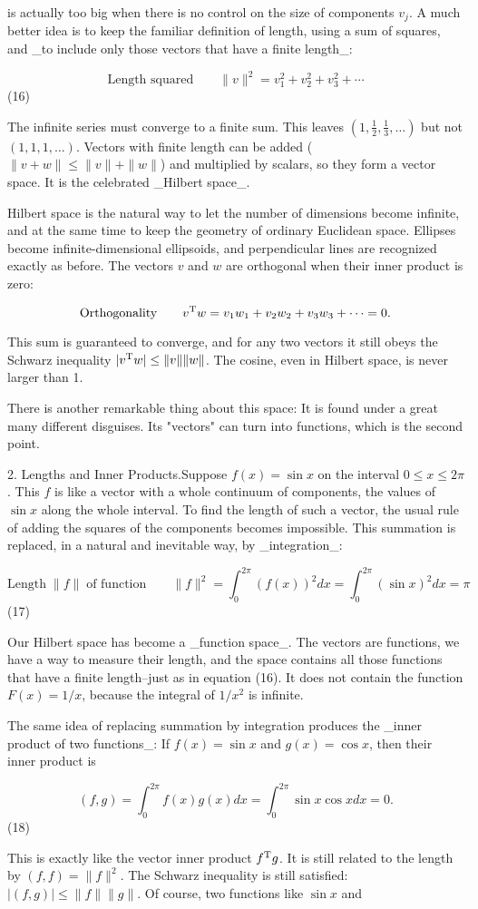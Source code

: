 is actually too big when there is no control on the size of components \(v_{j}\). A much better idea is to keep the familiar definition of length, using a sum of squares, and _to include only those vectors that have a finite length_:

\[\mbox{Length squared}\qquad\|v\|^{2}=v_{1}^{2}+v_{2}^{2}+v_{3}^{2}+\cdots\] (16)

The infinite series must converge to a finite sum. This leaves \((1,\frac{1}{2},\frac{1}{3},\ldots)\) but not \((1,1,1,\ldots)\). Vectors with finite length can be added (\(\|v+w\|\leq\|v\|+\|w\|\)) and multiplied by scalars, so they form a vector space. It is the celebrated _Hilbert space_.

Hilbert space is the natural way to let the number of dimensions become infinite, and at the same time to keep the geometry of ordinary Euclidean space. Ellipses become infinite-dimensional ellipsoids, and perpendicular lines are recognized exactly as before. The vectors \(v\) and \(w\) are orthogonal when their inner product is zero:

\[\mbox{Orthogonality}\qquad v^{\rm T}w=v_{1}w_{1}+v_{2}w_{2}+v_{3}w_{3}+\cdots=0.\]

This sum is guaranteed to converge, and for any two vectors it still obeys the Schwarz inequality \(|v^{\rm T}w|\leq\|v\|\|w\|\). The cosine, even in Hilbert space, is never larger than 1.

There is another remarkable thing about this space: It is found under a great many different disguises. Its "vectors" can turn into functions, which is the second point.

2. Lengths and Inner Products.Suppose \(f(x)=\sin x\) on the interval \(0\leq x\leq 2\pi\). This \(f\) is like a vector with a whole continuum of components, the values of \(\sin x\) along the whole interval. To find the length of such a vector, the usual rule of adding the squares of the components becomes impossible. This summation is replaced, in a natural and inevitable way, by _integration_:

\[\mbox{Length}\;\|f\|\;\mbox{of function}\qquad\|f\|^{2}=\int_{0}^{2\pi}(f(x))^{2} dx=\int_{0}^{2\pi}(\sin x)^{2}dx=\pi\] (17)

Our Hilbert space has become a _function space_. The vectors are functions, we have a way to measure their length, and the space contains all those functions that have a finite length--just as in equation (16). It does not contain the function \(F(x)=1/x\), because the integral of \(1/x^{2}\) is infinite.

The same idea of replacing summation by integration produces the _inner product of two functions_: If \(f(x)=\sin x\) and \(g(x)=\cos x\), then their inner product is

\[(f,g)=\int_{0}^{2\pi}f(x)g(x)dx=\int_{0}^{2\pi}\sin x\cos xdx=0.\] (18)

This is exactly like the vector inner product \(f^{\rm T}g\). It is still related to the length by \((f,f)=\|f\|^{2}\). The Schwarz inequality is still satisfied: \(|(f,g)|\leq\|f\|\|g\|\). Of course, two functions like \(\sin x\) and \ 